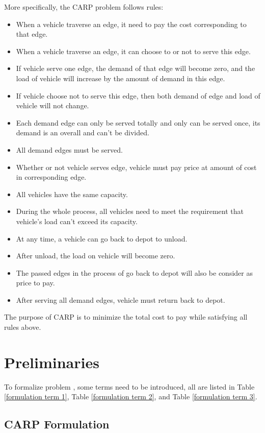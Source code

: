 \documentclass[journal]{IEEEtran}
\begin{document}
	More specifically, the CARP problem follows rules:
	
	\begin{itemize}
		\item When a vehicle traverse an edge, it need to pay the cost corresponding to that edge.
		\item When a vehicle traverse an edge, it  can choose to or not to serve this edge.
		\item If vehicle serve one edge, the demand of that edge will become zero, and the load of vehicle will increase by the amount of demand in this edge.
		\item If vehicle choose not to serve this edge, then both demand of edge and load of vehicle will not change.
		\item Each demand edge can only be served totally and only can be served once, its demand is an overall and can't be divided.
		\item All demand edges must be served.
		\item Whether or not vehicle serves edge, vehicle must pay price at amount of cost in corresponding edge.
		\item All vehicles have the same capacity.
		\item During the whole process, all vehicles need to meet the requirement that vehicle's load can't exceed its capacity.
		\item At any time, a vehicle can go back to depot to unload.
		\item After unload, the load on vehicle will become zero.
		\item The passed edges in the process of go back to depot will also be consider as price to pay.
		\item After serving all demand edges, vehicle must return back to depot.
	\end{itemize}

	The purpose of CARP is to minimize the total cost to pay while satisfying all rules above.
	
    

	\section{Preliminaries}
	
	To formalize problem , some terms need to be introduced, all are listed in Table \ref{formulation term 1}, Table \ref{formulation term 2}, and Table \ref{formulation term 3}.
	
	\subsection{CARP Formulation}
	
\end{document}
